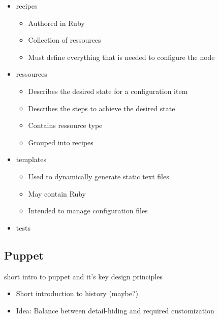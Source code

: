 \begin{itemize}
\begin{itemize}
		\item recipes
		\begin{itemize}
			\item Authored in Ruby
			\item Collection of ressources
			\item Must define everything that is needed to configure the node
		\end{itemize}
		\item ressources
		\begin{itemize}
			\item Describes the desired state for a configuration item
			\item Describes the steps to achieve the desired state
			\item Contains ressource type
			\item Grouped into recipes
		\end{itemize}
		\item templates
		\begin{itemize}
			\item Used to dynamically generate static text files
			\item May contain Ruby
			\item Intended to manage configuration files
		\end{itemize}
		\item tests
	\end{itemize}
\end{itemize}


\subsection{Puppet}
short intro to puppet and it's key design principles 

	\begin{itemize}
		\item Short introduction to history (maybe?)
		\item Idea: Balance between detail-hiding and required customization
	\end{itemize}

